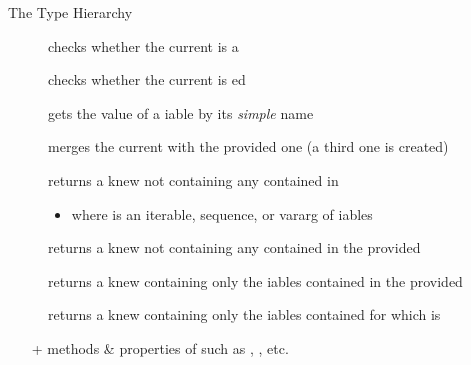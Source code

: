 \documentclass[handout]{beamer}
\begin{document}
\begin{frame}[allowframebreaks]{The  Type Hierarchy}
    \begin{description}
        \item[] checks whether the current  is a 
        \item[] checks whether the current  is ed
        \item[] gets the value of a iable by its \emph{simple} name
        \item[] merges the current  with the provided one (a third one is created)
        \item[] returns a knew  \alert{not} containing any  contained in 
        \begin{itemize}\small
            \item where  is an iterable, sequence, or vararg of iables
        \end{itemize}
        \item[]  returns a knew  \alert{not} containing any  contained in the provided 
        \item[] returns a knew  containing \alert{only} the iables contained in the provided 
        \item[] returns a knew  containing \alert{only} the iables contained for which  is 
    \end{description}
    \begin{itemize}
        \item[+] methods \& properties of  such as , , etc.
    \end{itemize}

    \framebreak


\end{frame}
\end{document}
